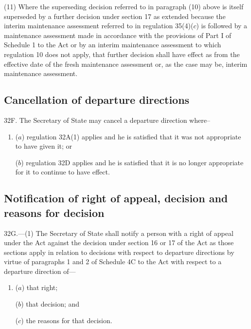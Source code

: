 \documentclass[12pt,a4paper]{article}
\begin{document}
(11) Where the superseding decision referred to in paragraph (10) above is itself superseded by a further decision under section 17 as extended because the interim maintenance assessment referred to in regulation 35(4)($c$) is followed by a maintenance assessment made in accordance with the provisions of Part I of Schedule 1 to the Act or by an interim maintenance assessment to which regulation 10 does not apply, that further decision shall have effect as from the effective date of the fresh maintenance assessment or, as the case may be, interim maintenance assessment.


\subsection[32F. Cancellation of departure directions]{Cancellation of departure directions}

32F.  The Secretary of State may cancel a departure direction where–
\begin{enumerate}\item[]
($a$) regulation 32A(1) applies and he is satisfied that it was not appropriate to have given it; or

($b$) regulation 32D applies and he is satisfied that it is no longer appropriate for it to continue to have effect.
\end{enumerate}


\subsection[32G. Notification of right of appeal, decision and reasons for decision]{Notification of right of appeal, decision and reasons for decision}

32G.—(1) The Secretary of State shall notify a person with a right of appeal under the Act against the decision under section 16 or 17 of the Act as those sections apply in relation to decisions with respect to departure directions by virtue of paragraphs 1 and 2 of Schedule 4C to the Act with respect to a departure direction of---
\begin{enumerate}\item[]
($a$) that right;

($b$) that decision; and

($c$) the reasons for that decision.
\end{enumerate}
\end{document}
